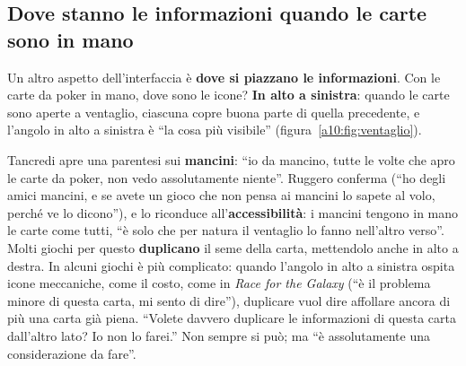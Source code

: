 \subsection{Dove stanno le informazioni quando le carte sono in mano}

Un altro aspetto dell'interfaccia è \textbf{dove si piazzano le informazioni}. Con le
carte da poker in mano, dove sono le icone? \textbf{In alto a sinistra}: quando le carte
sono aperte a ventaglio, ciascuna copre buona parte di quella precedente, e l'angolo in
alto a sinistra è ``la cosa più visibile'' (figura~\ref{a10:fig:ventaglio}).

Tancredi apre una parentesi sui \textbf{mancini}: ``io da mancino, tutte le volte che
apro le carte da poker, non vedo assolutamente niente''. Ruggero conferma (``ho degli
amici mancini, e se avete un gioco che non pensa ai mancini lo sapete al volo, perché
ve lo dicono''), e lo riconduce all'\textbf{accessibilità}: i mancini tengono in mano le
carte come tutti, ``è solo che per natura il ventaglio lo fanno nell'altro verso''. Molti
giochi per questo \textbf{duplicano} il seme della carta, mettendolo anche in alto a
destra. In alcuni giochi è più complicato: quando l'angolo in alto a sinistra ospita
icone meccaniche, come il costo, come in \emph{Race for the Galaxy} (``è il problema
minore di questa carta, mi sento di dire''), duplicare vuol dire affollare ancora di più
una carta già piena. ``Volete davvero duplicare le informazioni di questa carta
dall'altro lato? Io non lo farei.'' Non sempre si può; ma ``è assolutamente una
considerazione da fare''.

